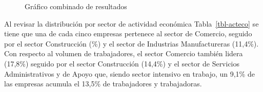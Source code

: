 \documentclass[
  11pt,
]{article}
\begin{document}
\FloatBarrier

\begin{figure}[H]

\caption{\label{fig-combined}Gráfico combinado de resultados}


\end{figure}%

\FloatBarrier

Al revisar la distribución por sector de actividad económica
Tabla~\ref{tbl-acteco} se tiene que una de cada cinco empresas pertenece
al sector de Comercio, seguido por el sector Construcción
(\%) y el sector de Industrias Manufactureras (11,4\%). Con
respecto al volumen de trabajadores, el sector Comercio también lidera
(17,8\%) seguido por el sector Construcción (14,4\%) y el sector de
Servicios Administrativos y de Apoyo que, siendo sector intensivo en
trabajo, un 9,1\% de las empresas acumula el 13,5\% de trabajadores y
trabajadoras.

\FloatBarrier
\end{document}
